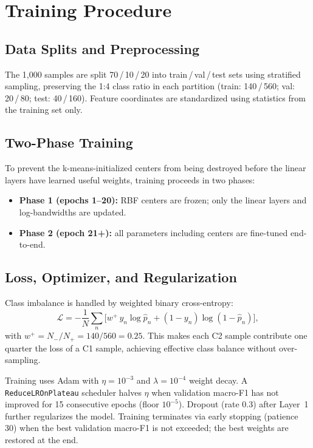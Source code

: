 \documentclass[conference]{IEEEtran}
\begin{document}
\section{Training Procedure}
\label{sec:training}

\subsection{Data Splits and Preprocessing}
The 1,000 samples are split 70\,/\,10\,/\,20 into train\,/\,val\,/\,test
sets using stratified sampling, preserving the 1:4 class ratio in each
partition (train: 140\,/\,560; val: 20\,/\,80; test: 40\,/\,160).
Feature coordinates are standardized using statistics from the training
set only.

\subsection{Two-Phase Training}
To prevent the k-means-initialized centers from being destroyed before
the linear layers have learned useful weights, training proceeds in
two phases:
\begin{itemize}
  \item \textbf{Phase 1 (epochs 1--20):} RBF centers are frozen; only
        the linear layers and log-bandwidths are updated.
  \item \textbf{Phase 2 (epoch 21+):} all parameters including centers
        are fine-tuned end-to-end.
\end{itemize}

\subsection{Loss, Optimizer, and Regularization}
Class imbalance is handled by weighted binary cross-entropy:
\begin{equation}
  \mathcal{L} = -\frac{1}{N}\sum_{n}\bigl[w^+\,y_n \log\hat{p}_n
  + (1-y_n)\log(1-\hat{p}_n)\bigr],
  \label{eq:loss}
\end{equation}
with $w^+ = N_{-}/N_{+} = 140/560 = 0.25$.  This makes each C2 sample
contribute one quarter the loss of a C1 sample, achieving effective
class balance without over-sampling.

Training uses Adam \cite{kingma2014adam} with $\eta{=}10^{-3}$ and
$\lambda{=}10^{-4}$ weight decay.  A
\texttt{ReduceLROnPlateau} scheduler halves $\eta$ when validation
macro-F1 has not improved for 15 consecutive epochs (floor $10^{-5}$).
Dropout (rate 0.3) after Layer~1 further regularizes the model.
Training terminates via early stopping (patience 30) when the best
validation macro-F1 is not exceeded; the best weights are restored at
the end.
\end{document}

